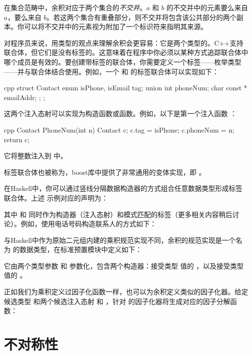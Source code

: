 \noindent
在集合范畴中，余积对应于两个集合的\emph{不交并}。$a$ 和 $b$ 的不交并中的元素要么来自 $a$，要么来自 $b$。若这两个集合有重叠部分，则不交并将包含该公共部分的两个副本。你可以将不交并中的元素视为附加了一个标识符来指明其来源。

对程序员来说，用类型的观点来理解余积会更容易：它是两个类型的。C++支持联合体，但它们是没有标签的。这意味着在程序中你必须以某种方式追踪联合体中哪个成员是有效的。要创建带标签的联合体，你需要定义一个标签——枚举类型——并与联合体结合使用。例如，一个  和  的标签联合体可以实现如下：

\begin{snip}{cpp}
struct Contact {
    enum { isPhone, isEmail } tag;
    union { int phoneNum; char const * emailAddr; };
};
\end{snip}
这两个注入态射可以实现为构造函数或函数。例如，以下是第一个注入函数 ：

\begin{snip}{cpp}
Contact PhoneNum(int n) {
    Contact c;
    c.tag = isPhone;
    c.phoneNum = n;
    return c;
}
\end{snip}
它将整数注入到  中。

标签联合体也被称为，boost库中提供了非常通用的变体实现，即 。

在Haskell中，你可以通过竖线分隔数据构造器的方式组合任意数据类型形成标签联合体。上述  示例对应的声明为：

其中  和  同时作为构造器（注入态射）和模式匹配的标签（更多相关内容稍后讨论）。例如，使用电话号码构造联系人的方式如下：

与Haskell中作为原始二元组内建的乘积规范实现不同，余积的规范实现是一个名为  的数据类型，在标准预置模块中定义如下：

它由两个类型参数  和  参数化，包含两个构造器：接受类型  值的 ，以及接受类型  值的 。

正如我们为乘积定义过因子化函数一样，也可以为余积定义类似的因子化器。给定候选类型  和两个候选注入态射  和 ，针对  的因子化器将生成对应的因子分解函数：


\section{不对称性}

